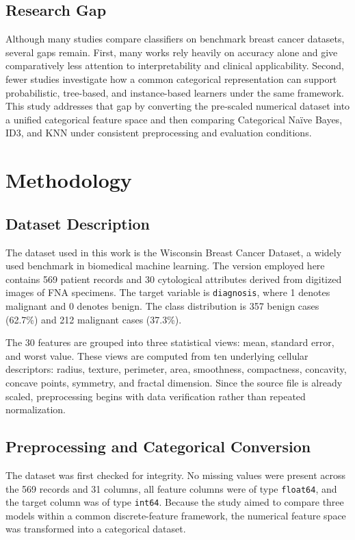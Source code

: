 \documentclass[conference]{IEEEtran}
\begin{document}
\subsection{Research Gap}
Although many studies compare classifiers on benchmark breast cancer datasets, several gaps remain. First, many works rely heavily on accuracy alone and give comparatively less attention to interpretability and clinical applicability. Second, fewer studies investigate how a common categorical representation can support probabilistic, tree-based, and instance-based learners under the same framework. This study addresses that gap by converting the pre-scaled numerical dataset into a unified categorical feature space and then comparing Categorical Na\"ive Bayes, ID3, and KNN under consistent preprocessing and evaluation conditions.

\section{Methodology}
\subsection{Dataset Description}
The dataset used in this work is the Wisconsin Breast Cancer Dataset, a widely used benchmark in biomedical machine learning. The version employed here contains 569 patient records and 30 cytological attributes derived from digitized images of FNA specimens. The target variable is \texttt{diagnosis}, where 1 denotes malignant and 0 denotes benign. The class distribution is 357 benign cases (62.7\%) and 212 malignant cases (37.3\%).

The 30 features are grouped into three statistical views: mean, standard error, and worst value. These views are computed from ten underlying cellular descriptors: radius, texture, perimeter, area, smoothness, compactness, concavity, concave points, symmetry, and fractal dimension. Since the source file is already scaled, preprocessing begins with data verification rather than repeated normalization.

\subsection{Preprocessing and Categorical Conversion}
The dataset was first checked for integrity. No missing values were present across the 569 records and 31 columns, all feature columns were of type \texttt{float64}, and the target column was of type \texttt{int64}. Because the study aimed to compare three models within a common discrete-feature framework, the numerical feature space was transformed into a categorical dataset.
\end{document}
